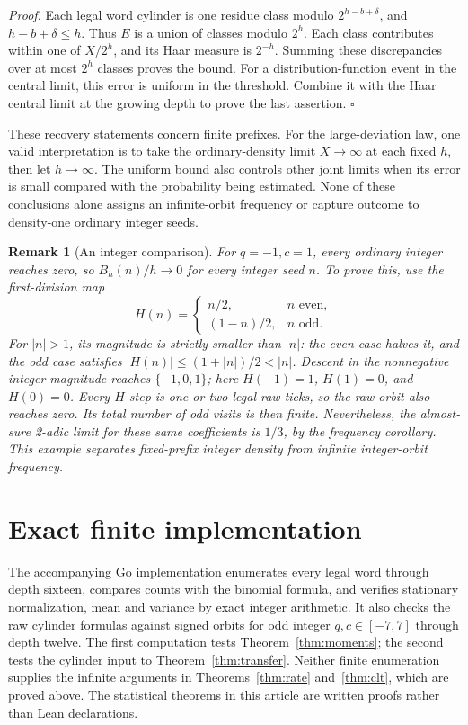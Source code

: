 \documentclass[11pt,letterpaper]{article}
\newtheorem{remark}[theorem]{Remark}
\newenvironment{proof}{\noindent\textit{Proof.}}{\hfill\(\square\)}
\begin{document}
\begin{proof}
Each legal word cylinder is one residue class modulo
\(2^{h-b+\delta}\), and \(h-b+\delta\le h\). Thus \(E\) is a union
of classes modulo \(2^h\). Each class contributes within one of
\(X/2^h\), and its Haar measure is \(2^{-h}\).
Summing these discrepancies over at most \(2^h\) classes proves
the bound. For a distribution-function event in the central limit,
this error is uniform in the threshold. Combine it with the Haar
central limit at the growing depth to prove the last assertion.
\end{proof}

These recovery statements concern finite prefixes. For the
large-deviation law, one valid interpretation is to take the
ordinary-density limit \(X\to\infty\) at each fixed \(h\), then
let \(h\to\infty\). The uniform bound also controls other joint
limits when its error is small compared with the probability
being estimated. None of these conclusions alone assigns an
infinite-orbit frequency or capture outcome to density-one
ordinary integer seeds.

\begin{remark}[An integer comparison]
For \(q=-1,c=1\), every ordinary integer reaches zero, so
\(B_h(n)/h\to0\) for every integer seed \(n\). To prove this,
use the first-division map
\[
H(n)=\begin{cases}n/2,&n\text{ even},\\(1-n)/2,&n\text{ odd}.
\end{cases}
\]
For \(|n|>1\), its magnitude is strictly smaller than \(|n|\):
the even case halves it, and the odd case satisfies
\(|H(n)|\le(1+|n|)/2<|n|\). Descent in the nonnegative
integer magnitude reaches \(\{-1,0,1\}\); here
\(H(-1)=1\), \(H(1)=0\), and \(H(0)=0\).
Every \(H\)-step is one or two legal raw ticks, so the raw orbit
also reaches zero. Its total number of odd visits is then finite.
Nevertheless, the almost-sure 2-adic limit for these same coefficients
is \(1/3\), by the frequency corollary. This example separates
fixed-prefix integer density from infinite integer-orbit frequency.
\end{remark}

\section{Exact finite implementation}

The accompanying Go implementation \cite{DyadicCode26} enumerates every
legal word through depth sixteen, compares counts with the
binomial formula, and verifies stationary normalization, mean
and variance by exact integer arithmetic. It also checks
the raw cylinder formulas against signed orbits for odd integer
\(q,c\in[-7,7]\) through depth twelve. The first computation tests
Theorem~\ref{thm:moments}; the second tests the cylinder input to
Theorem~\ref{thm:transfer}. Neither finite enumeration supplies the
infinite arguments in Theorems~\ref{thm:rate} and~\ref{thm:clt},
which are proved above. The statistical theorems in this article
are written proofs rather than Lean declarations.



\end{document}
